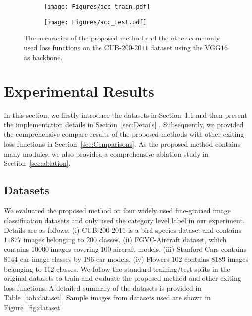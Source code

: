 \documentclass[journal]{IEEEtran}
\begin{document}
\begin{figure*}[!t]
  \centering
   \begin{subfigure}[t]{3.2in}
    \centering
    \texttt{[image: Figures/acc\_train.pdf]}
 \end{subfigure}
  \begin{subfigure}[t]{3.2in}
    \centering
    \texttt{[image: Figures/acc\_test.pdf]}
 \end{subfigure}

  \caption{The accuracies of the proposed method and the other commonly used loss functions on the CUB-$200$-$2011$ dataset using the VGG$16$ as backbone.}
  \label{fig:acc_curve}
\end{figure*}

\section{Experimental Results}

In this section, we firstly introduce the datasets in Section~\ref{sec:dataset} and then present the implementation details in Section~\ref{sec:Details} .  Subsequently, we provided the comprehensive compare results of the proposed methods with other exiting loss functions in Section~\ref{sec:Comparisons}.  As the proposed method contains many modules,   we also provided a comprehensive ablation study in Section~\ref{sec:ablation}.


\subsection{Datasets}\label{sec:dataset}

We evaluated the proposed method on four widely used fine-grained image classification datasets and only used the category level label in our experiment. Details are as follows: (i) CUB-$200$-$2011$ is a bird species dataset and contains $11877$ images belonging to $200$ classes. (ii) FGVC-Aircraft dataset, which contains $10000$ images covering $100$  aircraft models. (iii) Stanford Cars contains $8144$ car image classes by $196$ car models.  (iv) Flowers-$102$  contains $8189$ images belonging to $102$ classes. We follow the standard training/test splits in the original datasets to train and evaluate the proposed method and other exiting loss functions.  A detailed summary of the datasets is provided in Table~\ref{tab:dataset}. Sample images from datasets used are shown in Figure~\ref{fig:dataset}.
\end{document}
